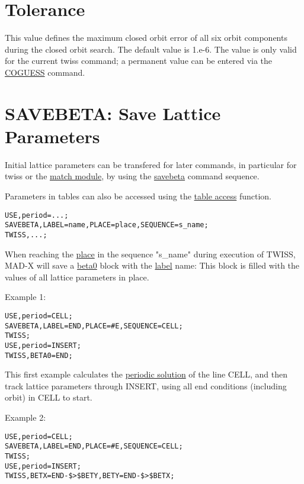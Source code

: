 \section{Tolerance}

This value defines the maximum closed orbit error of all six orbit
components during the closed orbit search. The default value is
1.e-6. The value is only valid for the current twiss command; a
permanent value can be entered via the
\href{../control/general.html#coguess}{COGUESS} command.  

\section{SAVEBETA: Save Lattice Parameters}

Initial lattice parameters can be transfered for later commands, in
particular for twiss or the \href{../match/match.html}{match module}, by
using the \href{../control/general.html#savebeta}{savebeta} command
sequence.  

Parameters in tables can also be accessed 
using the \href{../Introduction/expression.html#table}{table access}
function. 
\begin{verbatim}
USE,period=...;
SAVEBETA,LABEL=name,PLACE=place,SEQUENCE=s_name;
TWISS,...;
\end{verbatim}

When reaching the \href{../control/general.html#place}{place} in the
sequence "s\_name" during execution of TWISS, MAD-X will save a
\hyperlink{beta0}{beta0} block with the
\href{../Introduction/label.html}{label} name: This block is filled with
the values of all lattice parameters in place.  

Example 1: 
\begin{verbatim}
USE,period=CELL;
SAVEBETA,LABEL=END,PLACE=#E,SEQUENCE=CELL;
TWISS;
USE,period=INSERT;
TWISS,BETA0=END;
\end{verbatim}

This first example calculates the \hyperlink{periodic}{periodic
  solution} of the line CELL, and then track lattice parameters through
INSERT, using all end conditions (including orbit) in CELL to start.  

Example 2: 
\begin{verbatim}
USE,period=CELL;
SAVEBETA,LABEL=END,PLACE=#E,SEQUENCE=CELL;
TWISS;
USE,period=INSERT;
TWISS,BETX=END-$>$BETY,BETY=END-$>$BETX;
\end{verbatim}


